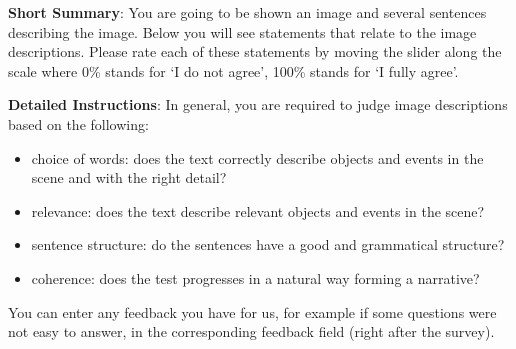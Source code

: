 \documentclass[11pt,a4paper]{article}
\begin{document}
\textbf{Short Summary}:
You are going to be shown an image and several sentences describing the image.
Below you will see statements that relate to the image descriptions.
Please rate each of these statements by moving the slider along the scale where 0\% stands for ‘I do not agree’, 100\% stands for ‘I fully agree’.

\vspace{.5cm}
\textbf{Detailed Instructions}:
In general, you are required to judge image descriptions based on the following:
\begin{itemize}
	\item choice of words: does the text correctly describe objects and events in the scene and with the right detail?
	\item relevance: does the text describe relevant objects and events in the scene?
	\item sentence structure: do the sentences have a good and grammatical structure?
	\item coherence: does the test progresses in a natural way forming a narrative?
\end{itemize}
You can enter any feedback you have for us, for example if some questions were not easy to answer, in the corresponding feedback field (right after the survey).

\vspace{.5cm}
\hspace{-.2cm}

\hspace{-.2cm}
\vspace{.5cm}
\end{document}
